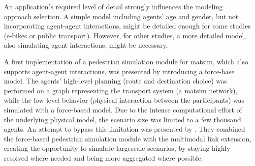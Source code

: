 An application's required level of detail strongly influences the modeling approach selection. A simple model including agents' age and gender, but not incorporating agent-agent interactions, might be detailed enough for some studies (\eg e-bikes or public transport). However, for other studies, a more detailed model, also simulating agent interactions, might be necessary. 

A first implementation of a pedestrian simulation module for \gls{matsim}, which also supports agent-agent interactions, was presented by \citet{00LaemmelPlaue2012CollisionAvoidingModels} introducing a force-base model. The agents' high-level planning (\ie route and destination choice) was performed on a graph representing the transport system (\eg a \gls{matsim} network), while the low level behavior (\ie physical interaction between the participants) was simulated with a force-based model. Due to the intense computational effort of the underlying physical model, the scenario size was limited to a few thousand agents. An attempt to bypass this limitation was presented by \citet{00DoblerLaemmel2012MultiModalEvac}. They combined the force-based pedestrian simulation module with the \gls{multimodal} link extension, creating the opportunity to simulate \gls{largescale} scenarios, by staying highly resolved where needed and being more aggregated where possible.


